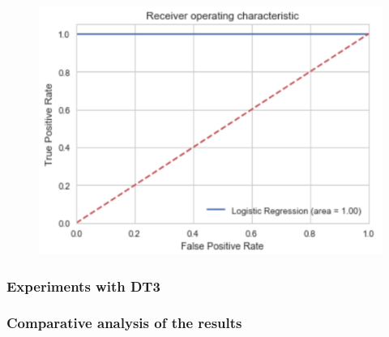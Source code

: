 \begin{figure}
\includegraphics[width=.8\textwidth]{images/curve_roc_dt2}
\end{figure}
\subsubsection{Experiments with DT3}
\subsubsection{Comparative analysis of the results}
